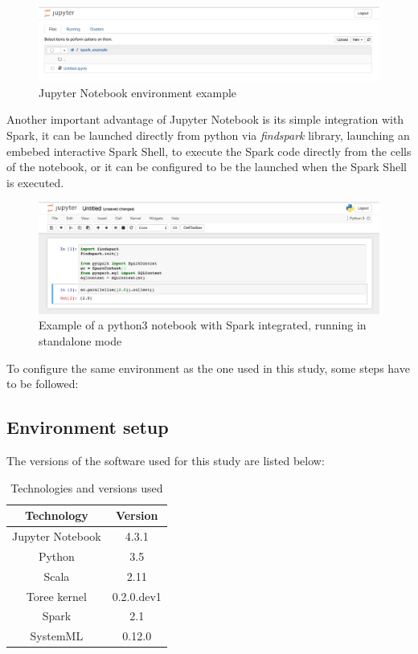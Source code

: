 \documentclass[11pt]{book} %
\begin{document}
    \begin{figure}[!ht]
      \centering
      \includegraphics[width=\textwidth]{jupyter_notebook.png}
      \caption{Jupyter Notebook environment example}
      \label{jupyter_notebook_environment}
    \end{figure}

    Another important advantage of Jupyter Notebook is its simple integration with Spark, it can be launched directly from python via \emph{findspark} library, launching an embebed interactive Spark Shell, to execute the Spark code directly from the cells of the notebook, or it can be configured to be the launched when the Spark Shell is executed.

    \begin{figure}[!ht]
      \centering
      \includegraphics[width=\textwidth]{spark_notebook_example.png}
      \caption{Example of a python3 notebook with Spark integrated, running in standalone mode}
      \label{notebook_spark_example}
    \end{figure}

    To configure the same environment as the one used in this study, some steps have to be followed:

    \subsection{Environment setup}

      The versions of the software used for this study are listed below:

    \begin{table}[!ht]
      \centering
      \begin{tabular}{| c | c |}
        \hline

        Technology & Version \\ \hline
        Jupyter Notebook & 4.3.1 \\ \hline
        Python & 3.5 \\ \hline
        Scala & 2.11 \\ \hline
        Toree kernel & 0.2.0.dev1 \\ \hline
        Spark & 2.1 \\ \hline
        SystemML & 0.12.0 \\

        \hline
      \end{tabular}
      \caption{Technologies and versions used}
    \end{table}
\end{document}

